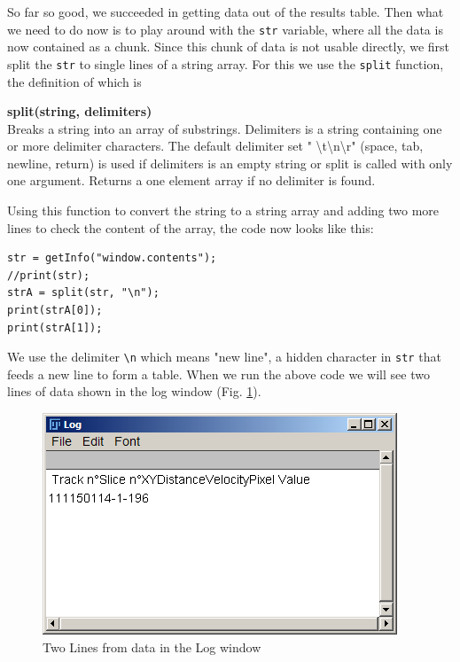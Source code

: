 \documentclass[11pt,a4paper,oneside]{report}
\newenvironment{indentCom}%
{\begin{list}{}%
         {\setlength{\leftmargin}{1em}}%
         \item[]%
}
{\end{list}}
\newcommand{\ilcom}[1]{\texttt{\small#1}}
\begin{document}
So far so good, we succeeded in getting data out of the results table. 
Then what we need to do now is to play around with the \ilcom{str} variable, 
where all the data is now contained as a chunk. Since this chunk of data is not usable directly, 
we first split the \ilcom{str} to single lines of a string array. 
For this we use the \ilcom{split} function, the definition of which is 

\begin{indentCom}
\textbf{split(string, delimiters)}\\
Breaks a string into an array of substrings. 
Delimiters is a string containing one or more delimiter characters. 
The default delimiter set " \textbackslash{}t\textbackslash{}n\textbackslash{}r" 
(space, tab, newline, return) is used if delimiters is an empty string or split is called with only one argument. 
Returns a one element array if no delimiter is found. 
\end{indentCom}

Using this function to convert the string to a string array and adding two more lines to check the content of the array, 
the code now looks like this:\\
\begin{lstlisting}[numbers=none, morekeywords={*, split}]
str = getInfo("window.contents");
//print(str);
strA = split(str, "\n");
print(strA[0]);
print(strA[1]);
\end{lstlisting}
We use the delimiter \ilcom{\textbackslash{}n} which means "new line", a hidden character in \ilcom{str} 
that feeds a new line to form a table. When we run the above code we will see two lines of data shown in the log window (Fig. \ref{fig:splittedLine}).
\begin{figure}[htbp]
\begin{center}
\includegraphics[scale=0.6]{fig/fig253_ZeroAndfirstlineValues.png}
\caption{Two Lines from data in the Log window}
\label{fig:splittedLine}
\end{center}
\end{figure}
\end{document}
